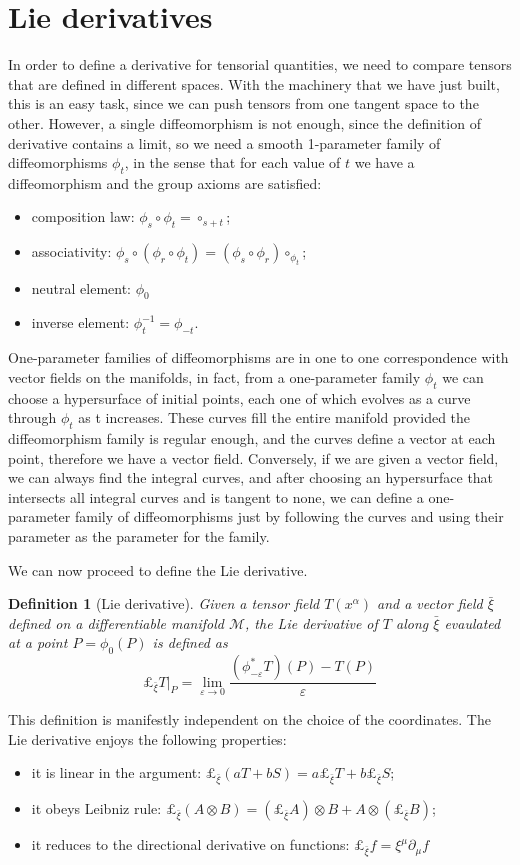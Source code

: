 \documentclass[a4paper]{article}
\newtheorem{definition}{Definition}
\begin{document}
\section{Lie derivatives}
In order to define a derivative for tensorial quantities, we need to compare tensors that are defined in different spaces. With the machinery that we have just built, this is an easy task, since we can push tensors from one tangent space to the other. However, a single diffeomorphism is not enough, since the definition of derivative contains a limit, so we need a smooth 1-parameter family of diffeomorphisms $\phi_{t}$, in the sense that for each value of $t$ we have a diffeomorphism and the group axioms are satisfied:
\begin{itemize}
  \item composition law: $\phi_s \circ \phi_t = \circ_{s+t}$;
  \item associativity: $\phi_s \circ (\phi_r \circ \phi_t) = (\phi_s \circ \phi_r) \circ_{\phi_t}$;
  \item neutral element: $\phi_0$
  \item inverse element: $\phi_t^{-1} = \phi_{-t}$.
\end{itemize}
One-parameter families of diffeomorphisms are in one to one correspondence with vector fields on the manifolds, in fact, from a one-parameter family $\phi_t$ we can choose a hypersurface of initial points, each one of which evolves as a curve through $\phi_t$ as t increases. These curves fill the entire manifold provided the diffeomorphism family is regular enough, and the curves define a vector at each point, therefore we have a vector field. Conversely, if we are given a vector field, we can always find the integral curves, and after choosing an hypersurface that intersects all integral curves and is tangent to none, we can define a one-parameter family of diffeomorphisms just by following the curves and using their parameter as the parameter for the family.

We can now proceed to define the Lie derivative.
\begin{definition}[Lie derivative]\label{def:lie-derivative}
  Given a tensor field $T(x^{\alpha})$ and a vector field $\bar{\xi}$ defined on a differentiable manifold $\mathcal{M}$, the Lie derivative of $T$ along $\bar{\xi}$ evaulated at a point $P = \phi_0(P)$ is defined as
  $$\pounds_{\bar{\xi}}T|_P = \lim_{\varepsilon \rightarrow 0} \frac{(\phi^*_{-\varepsilon} T)(P) - T(P)}{\varepsilon}$$
\end{definition}
This definition is manifestly independent on the choice of the coordinates.
The Lie derivative enjoys the following properties:
\begin{itemize}
  \item it is linear in the argument: $\pounds_{\bar{\xi}}(aT+bS) = a \pounds_{\bar{\xi}}T + b \pounds_{\bar{\xi}} S$;
  \item it obeys Leibniz rule: $\pounds_{\bar{\xi}} (A \otimes B) = (\pounds_{\bar{\xi}}A) \otimes B + A \otimes (\pounds_{\bar{\xi}} B)$;
  \item it reduces to the directional derivative on functions: $\pounds_{\bar{\xi}}f = \xi^{\mu}\partial_{\mu}f$
\end{itemize}
\end{document}
